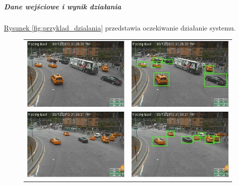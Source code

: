 \documentclass{article}
\begin{document}
\subparagraph{Dane wejściowe i wynik działania} \hyperref[fig:przyklad_dzialania]{Rysunek \ref*{fig:przyklad_dzialania}} przedstawia oczekiwanie działanie systemu.
\begin{figure}
\begin{center}
\begin{tabular}[c]{c c}
\includegraphics[scale=0.4]{MWSnap055.jpg} &
\includegraphics[scale=0.4]{11119220_994387450571628_742912767_n.jpg} \\
\includegraphics[scale=0.4]{MWSnap053.jpg} &
\includegraphics[scale=0.4]{11304256_994387423904964_745363915_n.jpg}

\end{tabular}
\end{center}
\end{figure}
\end{document}
